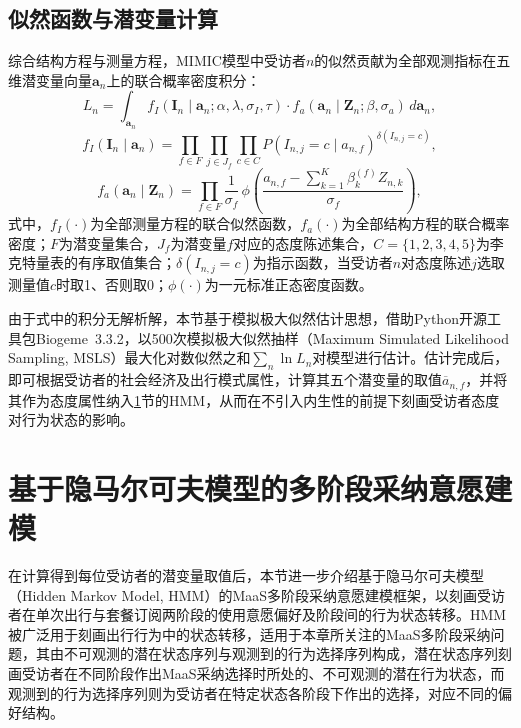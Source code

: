 \subsection{似然函数与潜变量计算}\label{subsec.int.likelihood}

综合结构方程与测量方程，MIMIC模型中受访者$n$的似然贡献为全部观测指标在五维潜变量向量$\boldsymbol{a}_n$上的联合概率密度积分：
\begin{equation}\label{eq.int.mimicLn}
L_n=\int_{\boldsymbol{a}_n} f_I\!\left(\boldsymbol{I}_n\mid \boldsymbol{a}_n;\alpha,\lambda,\sigma_I,\tau\right)\cdot f_a\!\left(\boldsymbol{a}_n\mid \boldsymbol{Z}_n;\beta,\sigma_a\right)\, d\boldsymbol{a}_n,
\end{equation}
\begin{equation}\label{eq.int.mimicfI}
f_I\!\left(\boldsymbol{I}_n\mid \boldsymbol{a}_n\right)=\prod_{f\in F}\prod_{j\in J_f}\prod_{c\in C} P\!\left(I_{n,j}=c\mid a_{n,f}\right)^{\delta(I_{n,j}=c)},
\end{equation}
\begin{equation}\label{eq.int.mimicfa}
f_a\!\left(\boldsymbol{a}_n\mid \boldsymbol{Z}_n\right)=\prod_{f\in F}\frac{1}{\sigma_f}\,\phi\!\left(\frac{a_{n,f}-\sum_{k=1}^{K}\beta_k^{(f)} Z_{n,k}}{\sigma_f}\right),
\end{equation}
式中，$f_I(\cdot)$为全部测量方程的联合似然函数，$f_a(\cdot)$为全部结构方程的联合概率密度；$F$为潜变量集合，$J_f$为潜变量$f$对应的态度陈述集合，$C=\{1,2,3,4,5\}$为李克特量表的有序取值集合；$\delta(I_{n,j}=c)$为指示函数，当受访者$n$对态度陈述$j$选取测量值$c$时取1、否则取0；$\phi(\cdot)$为一元标准正态密度函数。

由于式中的积分无解析解，本节基于模拟极大似然估计思想，借助Python开源工具包Biogeme~3.3.2\citep{bierlaireShortIntroductionBiogeme2023}，以500次模拟极大似然抽样（Maximum Simulated Likelihood Sampling, MSLS）最大化对数似然之和$\sum_n \ln L_n$对模型进行估计。估计完成后，即可根据受访者的社会经济及出行模式属性，计算其五个潜变量的取值$\overline{a}_{n,f}$，并将其作为态度属性纳入\ref{sec.int.hmm}节的HMM，从而在不引入内生性的前提下刻画受访者态度对行为状态的影响。

\section{基于隐马尔可夫模型的多阶段采纳意愿建模}\label{sec.int.hmm}

在计算得到每位受访者的潜变量取值后，本节进一步介绍基于隐马尔可夫模型（Hidden Markov Model, HMM）的MaaS多阶段采纳意愿建模框架，以刻画受访者在单次出行与套餐订阅两阶段的使用意愿偏好及阶段间的行为状态转移。HMM被广泛用于刻画出行行为中的状态转移\citep{chenHowIncomeSatisfaction2023,yuHighorderHiddenMarkov2023}，适用于本章所关注的MaaS多阶段采纳问题，其由不可观测的潜在状态序列与观测到的行为选择序列构成，潜在状态序列刻画受访者在不同阶段作出MaaS采纳选择时所处的、不可观测的潜在行为状态，而观测到的行为选择序列则为受访者在特定状态各阶段下作出的选择，对应不同的偏好结构。

